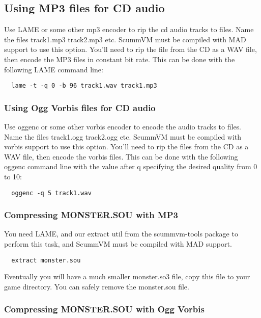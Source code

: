 

\subsection{Using MP3 files for CD audio}

Use LAME or some other mp3 encoder to rip the cd audio tracks to files. Name
the files track1.mp3 track2.mp3 etc. ScummVM must be compiled with MAD support
to use this option. You'll need to rip the file from the CD as a WAV file,
then encode the MP3 files in constant bit rate. This can be done with the 
following LAME command line:

\begin{verbatim}
  lame -t -q 0 -b 96 track1.wav track1.mp3
\end{verbatim}


\subsubsection{Using Ogg Vorbis files for CD audio}

Use oggenc or some other vorbis encoder to encode the audio tracks to files.
Name the files track1.ogg track2.ogg etc. ScummVM must be compiled with vorbis
support to use this option. You'll need to rip the files from the CD as a WAV
file, then encode the vorbis files. This can be done with the following oggenc
command line with the value after q specifying the desired quality from 0 to 10:

\begin{verbatim}
  oggenc -q 5 track1.wav
\end{verbatim}


\subsubsection{Compressing MONSTER.SOU with MP3}

You need LAME, and our extract util from the scummvm-tools package to perform
this task, and ScummVM must be compiled with MAD support.

\begin{verbatim}
  extract monster.sou
\end{verbatim}
%
Eventually you will have a much smaller monster.so3 file, copy this file
to your game directory. You can safely remove the monster.sou file.


\subsubsection{Compressing MONSTER.SOU with Ogg Vorbis}

